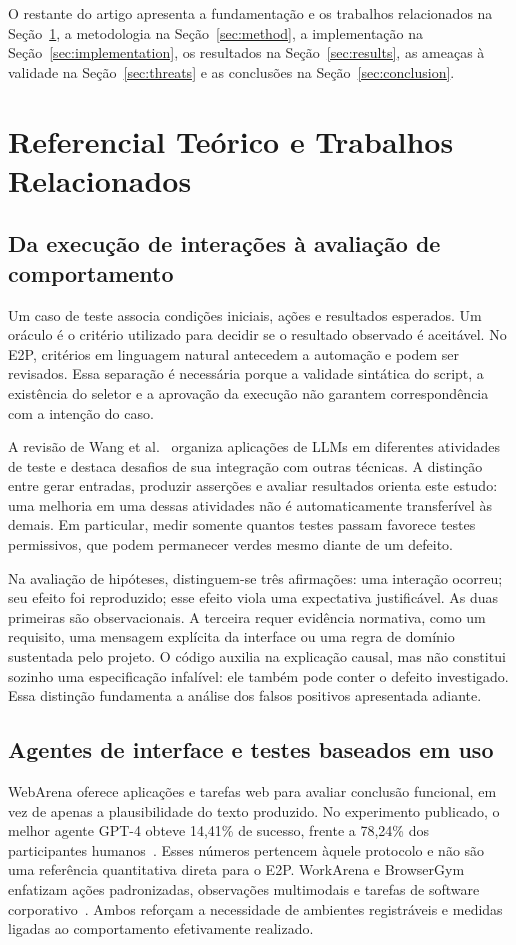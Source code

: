 \documentclass[12pt]{article}
\begin{document}
O restante do artigo apresenta a fundamentação e os trabalhos relacionados na Seção~\ref{sec:related}, a metodologia na Seção~\ref{sec:method}, a implementação na Seção~\ref{sec:implementation}, os resultados na Seção~\ref{sec:results}, as ameaças à validade na Seção~\ref{sec:threats} e as conclusões na Seção~\ref{sec:conclusion}.

\section{Referencial Teórico e Trabalhos Relacionados}\label{sec:related}
\subsection{Da execução de interações à avaliação de comportamento}
Um caso de teste associa condições iniciais, ações e resultados esperados. Um oráculo é o critério utilizado para decidir se o resultado observado é aceitável. No E2P, critérios em linguagem natural antecedem a automação e podem ser revisados. Essa separação é necessária porque a validade sintática do script, a existência do seletor e a aprovação da execução não garantem correspondência com a intenção do caso.

A revisão de Wang et al.~\cite{wang2024survey} organiza aplicações de LLMs em diferentes atividades de teste e destaca desafios de sua integração com outras técnicas. A distinção entre gerar entradas, produzir asserções e avaliar resultados orienta este estudo: uma melhoria em uma dessas atividades não é automaticamente transferível às demais. Em particular, medir somente quantos testes passam favorece testes permissivos, que podem permanecer verdes mesmo diante de um defeito.

Na avaliação de hipóteses, distinguem-se três afirmações: uma interação ocorreu; seu efeito foi reproduzido; esse efeito viola uma expectativa justificável. As duas primeiras são observacionais. A terceira requer evidência normativa, como um requisito, uma mensagem explícita da interface ou uma regra de domínio sustentada pelo projeto. O código auxilia na explicação causal, mas não constitui sozinho uma especificação infalível: ele também pode conter o defeito investigado. Essa distinção fundamenta a análise dos falsos positivos apresentada adiante.

\subsection{Agentes de interface e testes baseados em uso}
WebArena oferece aplicações e tarefas web para avaliar conclusão funcional, em vez de apenas a plausibilidade do texto produzido. No experimento publicado, o melhor agente GPT-4 obteve 14,41\% de sucesso, frente a 78,24\% dos participantes humanos~\cite{zhou2024webarena}. Esses números pertencem àquele protocolo e não são uma referência quantitativa direta para o E2P. WorkArena e BrowserGym enfatizam ações padronizadas, observações multimodais e tarefas de software corporativo~\cite{drouin2024workarena}. Ambos reforçam a necessidade de ambientes registráveis e medidas ligadas ao comportamento efetivamente realizado.
\end{document}
